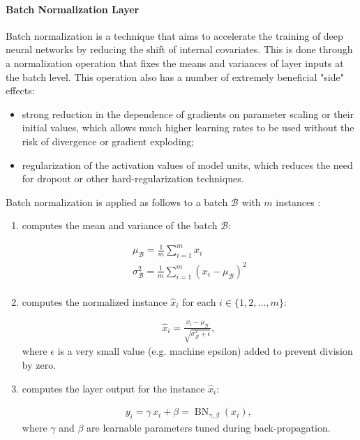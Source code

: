 \paragraph{Batch Normalization Layer} 
Batch normalization is a technique that aims to accelerate the training of deep neural networks by reducing the shift of internal covariates. 
This is done through a normalization operation that fixes the means and variances of layer inputs at the batch level. This operation also has a number of extremely beneficial "side" effects:
\begin{itemize}
	\item strong reduction in the dependence of gradients on parameter scaling or their initial values, which allows much higher learning rates to be used without the risk of divergence or gradient exploding;
	\item regularization of the activation values of model units, which reduces the need for dropout or other hard-regularization techniques.
\end{itemize}
Batch normalization is applied as follows to a batch $\mathcal{B}$ with $m$ instances \cite{batchnormalization}:

\begin{enumerate}[label=(\roman*), font=\itshape]
	
	\item computes the mean and variance of the batch $\mathcal{B}$:
	
	$$
	\begin{gathered}
		\mu_{\mathcal{B}}=\frac{1}{m} \sum_{i=1}^{m} x_{i} \\
		\sigma_{\mathcal{B}}^{2}=\frac{1}{m} \sum_{i=1}^{m}\left(x_{i}-\mu_{\mathcal{B}}\right)^{2} \\
	\end{gathered}
	$$
	
	\item computes the normalized instance $\hat{x}_{i}$ for each $i \in \{1, 2, ..., m\}$:
	
	$$
	\begin{gathered}
		\hat{x}_{i} = \frac{x_{i} - \mu_{\mathcal{B}}}{\sqrt{\sigma_{\mathcal{B}}^{2} + \epsilon}} \text{, }
	\end{gathered}
	$$
	where $\epsilon$ is a very small value (e.g. machine epsilon) added to prevent division by zero.
	
	\item computes the layer output for the instance $\hat{x}_i$:
	
	$$
	\begin{gathered}
		y_{i} = \gamma \, \hat{x}_{i} + \beta = \operatorname{BN}_{\gamma, \beta}\left(x_{i}\right) \text{, }
	\end{gathered} 
	$$
	where $\gamma$ and $\beta$ are learnable parameters tuned during back-propagation.
\end{enumerate}


